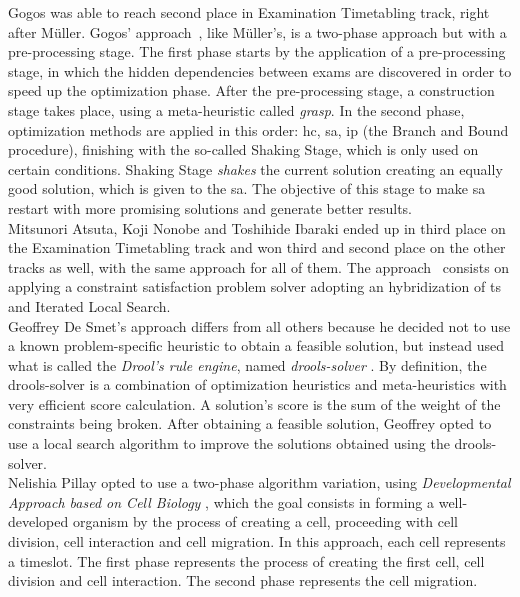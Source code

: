 
Gogos was able to reach second place in Examination Timetabling track, right after M\"{u}ller. Gogos' approach~\cite{Gogos2012}, like M\"{u}ller's, is a two-phase approach but with a pre-processing stage. The first phase starts by the application of a pre-processing stage, in which the hidden dependencies between exams are discovered in order to speed up the optimization phase. After the pre-processing stage, a construction stage takes place, using a meta-heuristic called \textit{\gls{grasp}}. In the second phase, optimization methods are applied in this order: \gls{hc}, \gls{sa}, \gls{ip} (the Branch and Bound procedure), finishing with the so-called Shaking Stage, which is only used on certain conditions. Shaking Stage \textit{shakes} the current solution creating an equally good solution, which is given to the \gls{sa}. The objective of this stage to make \gls{sa} restart with more promising solutions and generate better results.\\

Mitsunori Atsuta, Koji Nonobe and Toshihide Ibaraki ended up in third place on the Examination Timetabling track and won third and second place on the other tracks as well, with the same approach for all of them. The approach~\cite{Atsuta2007} consists on applying a constraint satisfaction problem solver adopting an hybridization of \gls{ts} and Iterated Local Search.\\

Geoffrey De Smet's approach \cite{Smet2007} differs from all others because he decided not to use a known problem-specific heuristic to obtain a feasible solution, but instead used what is called the \textit{Drool's rule engine}, named \textit{drools-solver} \cite{Drools}. By definition, the drools-solver is a combination of optimization heuristics and meta-heuristics with very efficient score calculation. A solution's score is the sum of the weight of the constraints being broken. After obtaining a feasible solution, Geoffrey opted to use a local search algorithm to improve the solutions obtained using the drools-solver.\\

Nelishia Pillay opted to use a two-phase algorithm variation, using \textit{Developmental Approach based on Cell Biology} \cite{Pillay2007}, which the goal consists in forming a well-developed organism by the process of creating a cell, proceeding with cell division, cell interaction and cell migration. In this approach, each cell represents a timeslot. The first phase represents the process of creating the first cell, cell division and cell interaction. The second phase represents the cell migration.